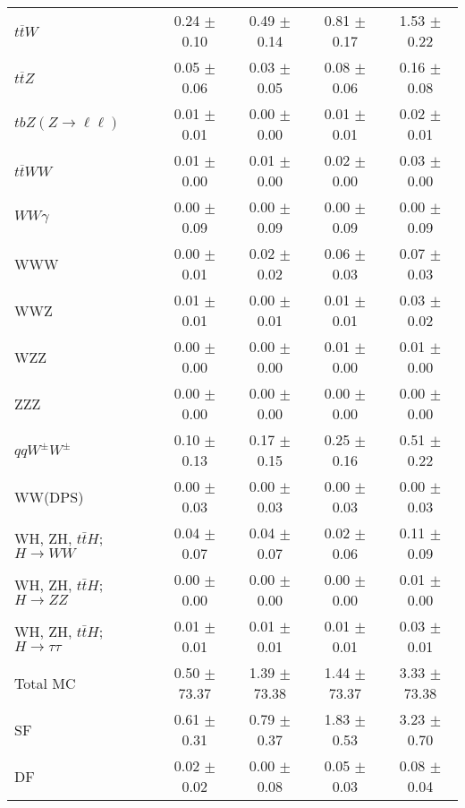 \begin{tabular}{l|cccc}
                   $t\overline{t}W$ &  0.24 $\pm$  0.10 &  0.49 $\pm$  0.14 &  0.81 $\pm$  0.17 &  1.53 $\pm$  0.22 \\
                   $t\overline{t}Z$ &  0.05 $\pm$  0.06 &  0.03 $\pm$  0.05 &  0.08 $\pm$  0.06 &  0.16 $\pm$  0.08 \\
    $tbZ (Z \rightarrow \ell \ell)$ &  0.01 $\pm$  0.01 &  0.00 $\pm$  0.00 &  0.01 $\pm$  0.01 &  0.02 $\pm$  0.01 \\
                  $t\overline{t}WW$ &  0.01 $\pm$  0.00 &  0.01 $\pm$  0.00 &  0.02 $\pm$  0.00 &  0.03 $\pm$  0.00 \\
                         $WW\gamma$ &  0.00 $\pm$  0.09 &  0.00 $\pm$  0.09 &  0.00 $\pm$  0.09 &  0.00 $\pm$  0.09 \\
                                WWW &  0.00 $\pm$  0.01 &  0.02 $\pm$  0.02 &  0.06 $\pm$  0.03 &  0.07 $\pm$  0.03 \\
                                WWZ &  0.01 $\pm$  0.01 &  0.00 $\pm$  0.01 &  0.01 $\pm$  0.01 &  0.03 $\pm$  0.02 \\
                                WZZ &  0.00 $\pm$  0.00 &  0.00 $\pm$  0.00 &  0.01 $\pm$  0.00 &  0.01 $\pm$  0.00 \\
                                ZZZ &  0.00 $\pm$  0.00 &  0.00 $\pm$  0.00 &  0.00 $\pm$  0.00 &  0.00 $\pm$  0.00 \\
                 $qqW^{\pm}W^{\pm}$ &  0.10 $\pm$  0.13 &  0.17 $\pm$  0.15 &  0.25 $\pm$  0.16 &  0.51 $\pm$  0.22 \\
                            WW(DPS) &  0.00 $\pm$  0.03 &  0.00 $\pm$  0.03 &  0.00 $\pm$  0.03 &  0.00 $\pm$  0.03 \\
WH, ZH, $t\bar{t}H$; $H \rightarrow WW$ &  0.04 $\pm$  0.07 &  0.04 $\pm$  0.07 &  0.02 $\pm$  0.06 &  0.11 $\pm$  0.09 \\
WH, ZH, $t\bar{t}H$; $H \rightarrow ZZ$ &  0.00 $\pm$  0.00 &  0.00 $\pm$  0.00 &  0.00 $\pm$  0.00 &  0.01 $\pm$  0.00 \\
WH, ZH, $t\bar{t}H$; $H \rightarrow \tau\tau$ &  0.01 $\pm$  0.01 &  0.01 $\pm$  0.01 &  0.01 $\pm$  0.01 &  0.03 $\pm$  0.01 \\
\hline\hline
                           Total MC &  0.50 $\pm$ 73.37 &  1.39 $\pm$ 73.38 &  1.44 $\pm$ 73.37 &  3.33 $\pm$ 73.38 \\
\hline
                                 SF &  0.61 $\pm$  0.31 &  0.79 $\pm$  0.37 &  1.83 $\pm$  0.53 &  3.23 $\pm$  0.70 \\
                                 DF &  0.02 $\pm$  0.02 &  0.00 $\pm$  0.08 &  0.05 $\pm$  0.03 &  0.08 $\pm$  0.04 \\

\end{tabular}
